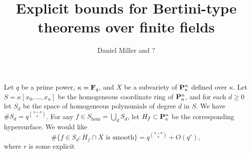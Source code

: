\documentclass{article}
\title{Explicit bounds for Bertini-type theorems over finite fields}
\author{Daniel Miller and ?}
\begin{document}
\maketitle





Let $q$ be a prime power, $\kappa=\mathbf{F}_q$, and $X$ be a subvariety of 
$\mathbf{P}_\kappa^n$ defined over $\kappa$. Let $S=\kappa[x_0,\dots,x_n]$ be the 
homogeneous coordinate ring of $\mathbf{P}_\kappa^n$, and for each $d\geq 0$ let 
$S_d$ be the space of homogeneous polynomials of degree $d$ in $S$. We have 
$\# S_d = q^{\binom{n+d}{n}}$. For any $f\in S_{\hom}=\bigcup_d S_d$, let 
$H_f\subset \mathbf{P}_\kappa^n$ be the corresponding hypersurface. We would like 
\[
  \#\{f\in S_d:H_f\cap X\text{ is smooth}\} = q^{\binom{n+d}{n}} + O(q^r) ,
\]
where $r$ is some explicit 
\end{document}
